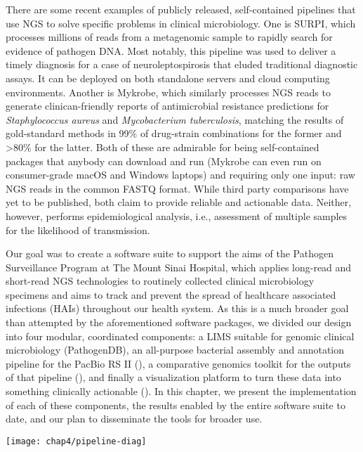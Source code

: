 There are some recent examples of publicly released, self-contained pipe\-lines that use NGS to solve specific problems in clinical microbiology. One is SURPI, which processes millions of reads from a metagenomic sample to rapidly search for evidence of pathogen DNA.\autocite{Naccache2014} Most notably, this pipeline was used to deliver a timely diagnosis for a case of neuroleptospirosis that eluded traditional diagnostic assays.\autocite{Wilson2014} It can be deployed on both standalone servers and cloud computing environments.\autocite{Naccache2014} Another is Mykrobe, which similarly processes NGS reads to generate clinican-friendly reports of antimicrobial resistance predictions for \emph{Staphylococcus aureus} and \emph{Mycobacterium tuberculosis}, matching the results of gold-standard methods in 99\% of drug-strain combinations for the former and >80\% for the latter.\autocite{Bradley2015} Both of these are admirable for being self-contained packages that anybody can download and run (Mykrobe can even run on consumer-grade macOS and Windows laptops) and requiring only one input: raw NGS reads in the common FASTQ format. While third party comparisons have yet to be published, both claim to provide reliable and actionable data. Neither, however, performs epidemiological analysis, i.e., assessment of multiple samples for the likelihood of transmission.

Our goal was to create a software suite to support the aims of the Pathogen Surveillance Program at The Mount Sinai Hospital, which applies long-read and short-read NGS technologies to routinely collected clinical microbiology specimens and aims to track and prevent the spread of healthcare associated infections (HAIs) throughout our health system. As this is a much broader goal than attempted by the aforementioned software packages, we divided our design into four modular, coordinated components: a LIMS suitable for genomic clinical microbiology (PathogenDB), an all-purpose bacterial assembly and annotation pipeline for the PacBio RS II (\pathogendbpipeline), a comparative genomics toolkit for the outputs of that pipeline (\pathogendbcomparison), and finally a visualization platform to turn these data into something clinically actionable (\pathogendbviz). In this chapter, we present the implementation of each of these components, the results enabled by the entire software suite to date, and our plan to disseminate the tools for broader use.

\begin{sidewaysfigure}[hp]
  \sidewaysvspace
  \centering
  \texttt{[image: chap4/pipeline-diag]}
\end{sidewaysfigure}

